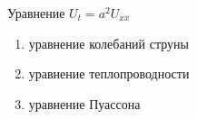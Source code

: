 Уравнение \(U_t=a^2U_{xx}\)

\begin{enumerate}[label=\arabic*)]
    \item уравнение колебаний струны
    \item уравнение теплопроводности
    \item уравнение Пуассона
\end{enumerate}

